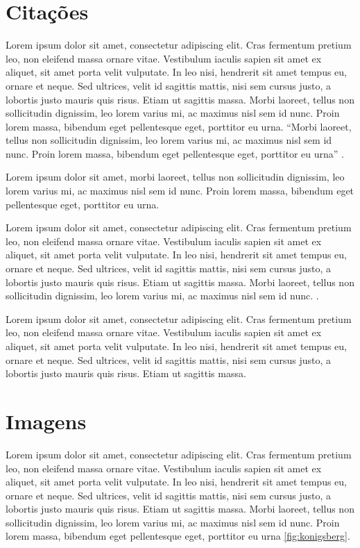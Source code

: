 \chapter{Citações}

Lorem ipsum dolor sit amet, consectetur adipiscing elit. Cras fermentum pretium leo, non eleifend massa ornare vitae. Vestibulum iaculis sapien sit amet ex aliquet, sit amet porta velit vulputate. In leo nisi, hendrerit sit amet tempus eu, ornare et neque. Sed ultrices, velit id sagittis mattis, nisi sem cursus justo, a lobortis justo mauris quis risus. Etiam ut sagittis massa. Morbi laoreet, tellus non sollicitudin dignissim, leo lorem varius mi, ac maximus nisl sem id nunc. Proin lorem massa, bibendum eget pellentesque eget, porttitor eu urna. \enquote{Morbi laoreet, tellus non sollicitudin dignissim, leo lorem varius mi, ac maximus nisl sem id nunc. Proin lorem massa, bibendum eget pellentesque eget, porttitor eu urna} \cite{netto}.

Lorem ipsum dolor sit amet, \textcite{netto} morbi laoreet, tellus non sollicitudin dignissim, leo lorem varius mi, ac maximus nisl sem id nunc. Proin lorem massa, bibendum eget pellentesque eget, porttitor eu urna. 
\begin{citacao}
Lorem ipsum dolor sit amet, consectetur adipiscing elit. Cras fermentum pretium leo, non eleifend massa ornare vitae. Vestibulum iaculis sapien sit amet ex aliquet, sit amet porta velit vulputate. In leo nisi, hendrerit sit amet tempus eu, ornare et neque. Sed ultrices, velit id sagittis mattis, nisi sem cursus justo, a lobortis justo mauris quis risus. Etiam ut sagittis massa. Morbi laoreet, tellus non sollicitudin dignissim, leo lorem varius mi, ac maximus nisl sem id nunc. \cite[p. 5]{gonzalez}.
\end{citacao}

Lorem ipsum dolor sit amet, consectetur adipiscing elit. Cras fermentum pretium leo, non eleifend massa ornare vitae. Vestibulum iaculis sapien sit amet ex aliquet, sit amet porta velit vulputate. In leo nisi, hendrerit sit amet tempus eu, ornare et neque. Sed ultrices, velit id sagittis mattis, nisi sem cursus justo, a lobortis justo mauris quis risus. Etiam ut sagittis massa.


\chapter{Imagens}

Lorem ipsum dolor sit amet, consectetur adipiscing elit. Cras fermentum pretium leo, non eleifend massa ornare vitae. Vestibulum iaculis sapien sit amet ex aliquet, sit amet porta velit vulputate. In leo nisi, hendrerit sit amet tempus eu, ornare et neque. Sed ultrices, velit id sagittis mattis, nisi sem cursus justo, a lobortis justo mauris quis risus. Etiam ut sagittis massa. Morbi laoreet, tellus non sollicitudin dignissim, leo lorem varius mi, ac maximus nisl sem id nunc. Proin lorem massa, bibendum eget pellentesque eget, porttitor eu urna \autoref{fig:konigsberg}.

